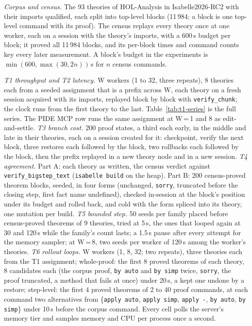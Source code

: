 \documentclass[11pt]{article}
\newcommand{\code}[1]{\colorbox{gray!12}{\texttt{\vphantom{Ag}#1}}}
\begin{document}
\emph{Corpus and census.} The 93 theories of HOL-Analysis in
Isabelle2026-RC2 with their imports qualified, each split into top-level
blocks (11\,984; a block is one top-level command with its proof). The
census replays every theory once at one worker, each on a session with the
theory's imports, with a 600\,s budget per block; it proved all 11\,984
blocks, and its per-block times and command counts key every later
measurement. A block's budget in the experiments is $\min(600,
\max(30, 2n))$\,s for $n$ census commands.

\emph{T1 throughput and T2 latency.} W workers (1 to 32, three repeats),
8 theories each from a seeded assignment that is a prefix across W, each
theory on a fresh session acquired with its imports, replayed block by
block with \code{verify\_chunk}; the clock runs from the first theory to
the last. Table~\ref{tab:t1-series} is the full series. The PIDE MCP row
runs the same assignment at W\,=\,1 and 8 as edit-and-settle.
\emph{T3 branch cost.} 200 proof states, a third each early, in the middle
and late in their theories, each on a session created for it: checkpoint,
verify the next block, three restores each followed by the block, two
rollbacks each followed by the block, then the prefix replayed in a new
theory node and in a new session. \emph{T4 agreement.} Part A: each theory
as written, the census verdict against \code{verify\_bigstep\_text}
(\code{isabelle build} on the heap). Part B: 200 census-proved theorem
blocks, seeded, in four forms (unchanged, \code{sorry}, truncated before
the closing step, first fact name undefined), checked in-session at the
block's position under its budget and rolled back, and cold with the form
spliced into its theory, one mutation per build. \emph{T5 bounded step.}
50 seeds per family placed before census-proved theorems of 9 theories,
tried at 5\,s, the ones that looped again at 30 and 120\,s while the
family's count lasts; a 1.5\,s pause after every attempt for the memory
sampler; at W\,=\,8, two seeds per worker of 120\,s among the worker's
theories. \emph{T6 rollout loops.} W workers (1, 8, 32; two repeats), three
theories each from the T1 assignment; whole-proof: the first 8 proved
theorems of each theory, 8 candidates each (the corpus proof, \code{by
auto} and \code{by simp} twice, \code{sorry}, the proof truncated, a method
that fails at once) under 20\,s, a kept one undone by a restore;
step-level: the first 4 proved theorems of 2 to 40 proof commands, at each
command two alternatives from \{\code{apply auto}, \code{apply simp},
\code{apply -}, \code{by auto}, \code{by simp}\} under 10\,s before the
corpus command. Every cell polls the server's memory tier and samples
memory and CPU per process once a second.
\end{document}

